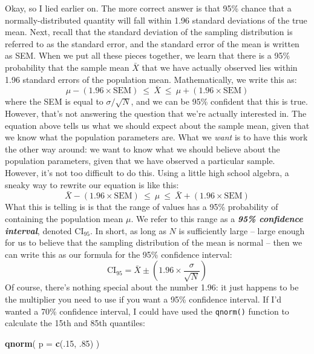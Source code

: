 \documentclass[spanish,]{book}
\newenvironment{Shaded}{\begin{snugshade}}{\end{snugshade}}
\newcommand{\KeywordTok}[1]{\textcolor[rgb]{0.13,0.29,0.53}{\textbf{#1}}}
\newcommand{\DataTypeTok}[1]{\textcolor[rgb]{0.13,0.29,0.53}{#1}}
\newcommand{\DecValTok}[1]{\textcolor[rgb]{0.00,0.00,0.81}{#1}}
\newcommand{\NormalTok}[1]{#1}
\begin{document}
Okay, so I lied earlier on. The more correct answer is that 95\% chance
that a normally-distributed quantity will fall within 1.96 standard
deviations of the true mean. Next, recall that the standard deviation of
the sampling distribution is referred to as the standard error, and the
standard error of the mean is written as SEM. When we put all these
pieces together, we learn that there is a 95\% probability that the
sample mean \(\bar{X}\) that we have actually observed lies within 1.96
standard errors of the population mean. Mathematically, we write this
as: \[
\mu - \left( 1.96 \times \mbox{SEM} \right) \ \leq \  \bar{X}\  \leq \  \mu + \left( 1.96 \times \mbox{SEM} \right) 
\] where the SEM is equal to \(\sigma / \sqrt{N}\), and we can be 95\%
confident that this is true. However, that's not answering the question
that we're actually interested in. The equation above tells us what we
should expect about the sample mean, given that we know what the
population parameters are. What we \emph{want} is to have this work the
other way around: we want to know what we should believe about the
population parameters, given that we have observed a particular sample.
However, it's not too difficult to do this. Using a little high school
algebra, a sneaky way to rewrite our equation is like this: \[
\bar{X} -  \left( 1.96 \times \mbox{SEM} \right) \ \leq \ \mu  \ \leq  \ \bar{X} +  \left( 1.96 \times \mbox{SEM}\right)
\] What this is telling is is that the range of values has a 95\%
probability of containing the population mean \(\mu\). We refer to this
range as a \textbf{\emph{95\% confidence interval}}, denoted
\(\mbox{CI}_{95}\). In short, as long as \(N\) is sufficiently large --
large enough for us to believe that the sampling distribution of the
mean is normal -- then we can write this as our formula for the 95\%
confidence interval: \[
\mbox{CI}_{95} = \bar{X} \pm \left( 1.96 \times \frac{\sigma}{\sqrt{N}} \right)
\] Of course, there's nothing special about the number 1.96: it just
happens to be the multiplier you need to use if you want a 95\%
confidence interval. If I'd wanted a 70\% confidence interval, I could
have used the \texttt{qnorm()} function to calculate the 15th and 85th
quantiles:

\begin{Shaded}
\begin{Highlighting}[]
\KeywordTok{qnorm}\NormalTok{( }\DataTypeTok{p =} \KeywordTok{c}\NormalTok{(.}\DecValTok{15}\NormalTok{, .}\DecValTok{85}\NormalTok{) )}
\end{Highlighting}
\end{Shaded}
\end{document}

